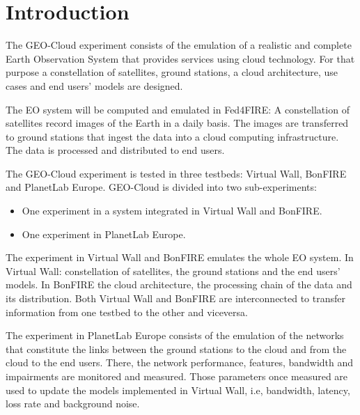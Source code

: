 \documentclass[a4paper]{article}
\newcommand\liststyleLFOxli{%
\renewcommand\labelitemi{[F0B7?]}
\renewcommand\labelitemii{o}
\renewcommand\labelitemiii{[F0A7?]}
\renewcommand\labelitemiv{[F0B7?]}
}
\begin{document}
\bigskip

\setcounter{tocdepth}{3}
\tableofcontents

\bigskip

\section[Introduction]{Introduction}
\label{bkm:Ref378931869}\hypertarget{Toc381777184}{}\label{bkm:Ref378929304}
\bigskip

The GEO-Cloud experiment consists of the emulation of a realistic and
complete Earth Observation System that provides services using cloud
technology. For that purpose a constellation of satellites, ground
stations, a cloud architecture, use cases and end
users{\textquoteright} models are designed.


\bigskip

The EO system will be computed and emulated in Fed4FIRE: A constellation
of satellites record images of the Earth in a daily basis. The images
are transferred to ground stations that ingest the data into a cloud
computing infrastructure. The data is processed and distributed to end
users.


\bigskip

The GEO-Cloud experiment is tested in three testbeds: Virtual Wall,
BonFIRE and PlanetLab Europe. GEO-Cloud is divided into two
sub-experiments:

\liststyleLFOxli
\begin{itemize}
\item One experiment in a system integrated in Virtual Wall and BonFIRE.
\item One experiment in PlanetLab Europe.
\end{itemize}
The experiment in Virtual Wall and BonFIRE emulates the whole EO system.
In Virtual Wall: constellation of satellites, the ground stations and
the end users{\textquoteright} models. In BonFIRE the cloud
architecture, the processing chain of the data and its distribution.
Both Virtual Wall and BonFIRE are interconnected to transfer
information from one testbed to the other and viceversa.


\bigskip

The experiment in PlanetLab Europe consists of the emulation of the
networks that constitute the links between the ground stations to the
cloud and from the cloud to the end users. There, the network
performance, features, bandwidth and impairments are monitored and
measured. Those parameters once measured are used to update the models
implemented in Virtual Wall, i.e, bandwidth, latency, loss rate and
background noise.
\end{document}

